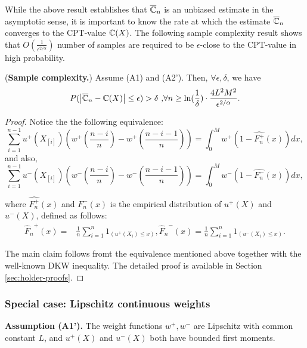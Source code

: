 \documentclass[11pt,letterpaper,english]{article}
\begin{document}
While the above result establishes that $\overline {\mathbb{C}}_n$ is an unbiased estimate in the asymptotic sense, it is important to know the rate at which the estimate $\overline {\mathbb{C}}_n$ converges to the CPT-value $\mathbb{C}(X)$. 
The following sample complexity result shows that $O\left(\frac{1}{\epsilon^{2/\alpha}}\right)$ number of samples are required to be $\epsilon$-close to the CPT-value in high probability.

% 

\begin{proposition}(\textbf{Sample complexity.})
\label{prop:holder-dkw}
Assume (A1) and (A2'). Then, $\forall \epsilon, \delta$, we have
$$
P(\left |\overline {\mathbb{C}}_n- \mathbb{C}(X) \right| \leq  \epsilon ) > \delta\text{     ,} \forall n \geq \ln(\frac{1}{\delta})\cdot 
\frac{4L^2 M^2}{\epsilon^{2/\alpha}}.$$
\end{proposition}
\begin{proof}
Notice the the following equivalence:
$$\sum_{i=1}^{n-1} u^+(X_{[i]}) (w^+(\frac{n-i}{n}) - w^+(\frac{n-i-1}{n})) =  \int_0^M w^+(1-\hat{F^+_n}(x)) dx, $$
and also,
$$\sum_{i=1}^{n-1} u^-(X_{[i]}) (w^-(\frac{n-i}{n}) - w^-(\frac{n-i-1}{n})) =  \int_0^M w^-(1-\hat{F^-_n}(x)) dx, $$

where $\hat{F^+_n}(x)$ and $\hat{F^-_n}(x)$ is the empirical distribution of $u^+(X)$
and $u^-(X)$, defined as follows:
\begin{align}
{\hat F_n}^+(x)=&\frac{1}{n} \sum_{i=1}^n 1_{(u^+(X_i) \leq x)}, 
{\hat F_n}^-(x)=\frac{1}{n} \sum_{i=1}^n 1_{(u^-(X_i) \leq x)}.
\label{eq:edf}
\end{align}

The main claim follows fromt the equivalence mentioned above together with the well-known DKW inequality.
The detailed proof is available in Section \ref{sec:holder-proofs}.
\end{proof}

\subsubsection*{Special case: Lipschitz continuous weights}
\textbf{Assumption (A1').}  The weight functions $w^+, w^-$ are Lipschitz with common constant $L$, and 
$u^+(X)$ and $u^-(X)$ both have bounded first moments.\\[1ex]
\end{document}
